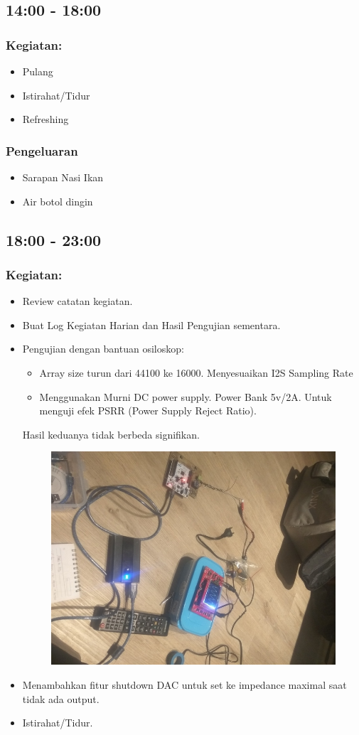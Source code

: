 \documentclass[12pt,]{article}
\begin{document}
	\newpage
	\subsection{14:00 - 18:00}
	\subsubsection{Kegiatan:}
	\begin{itemize}
		\item Pulang
		\item Istirahat/Tidur
		\item Refreshing
	\end{itemize}
	\subsubsection{Pengeluaran}
	\begin{itemize}
		\item Sarapan Nasi Ikan
		\item Air botol dingin
	\end{itemize}

	\subsection{18:00 - 23:00}
	\subsubsection{Kegiatan:}
	\begin{itemize}
		\item Review catatan kegiatan.
		\item Buat Log Kegiatan Harian dan Hasil Pengujian sementara.
		\item Pengujian dengan bantuan osiloskop:
		\begin{itemize}
			\item Array size turun dari 44100 ke 16000.
			Menyesuaikan I2S Sampling Rate
			\item Menggunakan Murni DC power supply.
			Power Bank 5v/2A.
			Untuk menguji efek PSRR (Power Supply Reject Ratio).
		\end{itemize}
		Hasil keduanya tidak berbeda signifikan.
		\begin{figure}[H]
			\centering
			\includegraphics[width=0.5\linewidth]{result/nighttest}
		\end{figure}
		\item Menambahkan fitur shutdown DAC untuk set ke impedance maximal saat tidak ada output.
		\item Istirahat/Tidur.
	\end{itemize}
	
\end{document}
